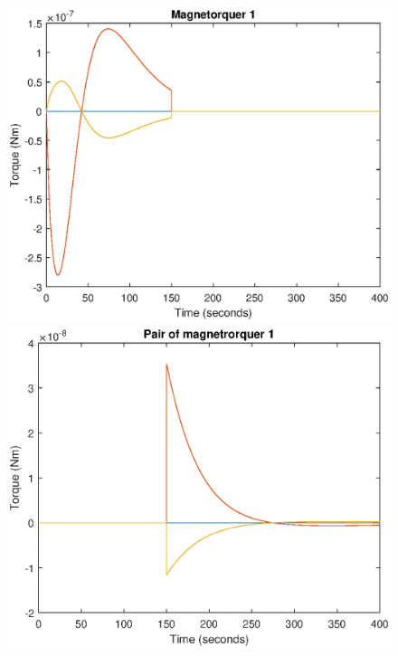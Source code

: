 \begin{figure}[ht]  
	\begin{minipage}{0.5\textwidth}
		\includegraphics[width=\textwidth]{figures/config1.eps}
	\end{minipage}
	\hfill
	\begin{minipage}{0.5\textwidth}
		\includegraphics[width=\textwidth]{figures/config11.eps}
	\end{minipage}
\end{figure}
